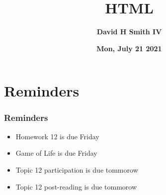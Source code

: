 \documentclass{beamer}
\title{\textbf{HTML}}
\author{\textbf{David H Smith IV}}
\institute[\textbf{UIUC}]{\textbf{University of Illinois Urbana-Champaign}}
\date{\textbf{Mon, July 21 2021}}
\begin{document}
\frame{\titlepage}

\section{Reminders}

%
%
\begin{frame}
    \frametitle{Reminders}
    \begin{itemize}
        \item Homework 12 is due Friday
        \item Game of Life is due Friday
        \item Topic 12 participation is due tommorow
        \item Topic 12 post-reading is due tommorow
    \end{itemize}
\end{frame}
\end{document}
